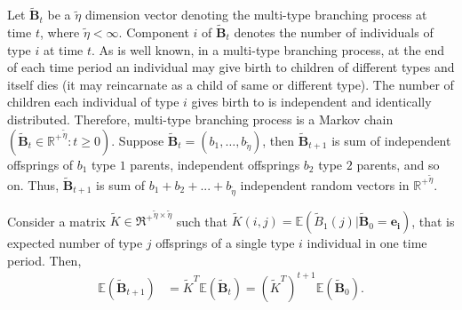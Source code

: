 \documentclass{article}
\theoremstyle{definition}
\newcommand{\lrp}[1]{\left({#1}\right)}
\newcommand{\Exp}[1]{\mathbb{E}\lrp{#1}}
\begin{document}
Let ${\bm{\tilde{B}}_t}$ be a $\tilde{\eta}$ dimension vector denoting the multi-type branching process at time $t$, 
where $\tilde{\eta} < \infty$.  Component $i$ of ${\bm{\tilde{B}}_t}$ denotes  the number of individuals of type $i$ 
at time $t$. As is well known, in a multi-type branching process, at the end of each time period an individual may give birth to children of different types and itself dies (it may reincarnate as a child
 of same or different type).  
 The number of children each individual of type $i$ gives birth to  is independent and identically distributed. Therefore, multi-type branching process is a Markov chain $(\bm{\tilde{B}}_t \in \mathbb{{R^+}^{\tilde{\eta}}} :t \geq 0)$. Suppose  $\bm{\tilde{B}}_t = (b_1,\ldots,b_{\tilde{\eta}})$, then $\bm{\tilde{B}}_{t+1}$ is sum  of independent offsprings of $b_1$ type $1$ parents, independent offsprings $b_2$  type $2$ parents, and so on. Thus, $\bm{\tilde{B}}_{t+1}$ is sum of $b_1+b_2+...+ b_{\tilde{\eta}}$ independent random vectors in $\mathbb{{R^+}^{\tilde{\eta}}}$. 
 


Consider a matrix  $\tilde{K}\in {\Re^+}^{\tilde{\eta} \times \tilde{\eta}}$ such that $\tilde{K}(i,j) = \Exp{\tilde{B}_1(j)|\bm{\tilde{B}}_0 =\bm{e_i}}$, that is expected number of type $j$ offsprings of a single type  $i$ individual in one time period. Then, 
\begin{equation*}
    \begin{aligned}
        \Exp{\bm{\tilde{B}}_{t+1}} &=  \tilde{K}^T \Exp{ \bm{\tilde{B}}_t } = (\tilde{K}^T)^{t+1} \Exp{\bm{\tilde{B}}_0}. 
    \end{aligned}
\end{equation*}
\end{document}
